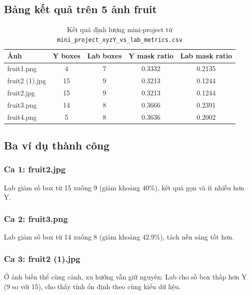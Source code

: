 \documentclass[12pt,a4paper]{article}
\begin{document}
\subsection{Bảng kết quả trên 5 ảnh fruit}
\begin{table}[H]
    \centering
    \caption{Kết quả định lượng mini-project từ \texttt{mini\_project\_xyzY\_vs\_lab\_metrics.csv}}
    \begin{tabular}{lcccc}
        \toprule
        Ảnh & Y boxes & Lab boxes & Y mask ratio & Lab mask ratio \\
        \midrule
        fruit1.png & 4 & 7 & 0.3332 & 0.2135 \\
        fruit2 (1).jpg & 15 & 9 & 0.3213 & 0.1244 \\
        fruit2.jpg & 15 & 9 & 0.3213 & 0.1244 \\
        fruit3.png & 14 & 8 & 0.3666 & 0.2391 \\
        fruit4.png & 5 & 8 & 0.3636 & 0.2002 \\
        \bottomrule
    \end{tabular}
\end{table}

\subsection{Ba ví dụ thành công}

\subsubsection{Ca 1: fruit2.jpg}
Lab giảm số box từ 15 xuống 9 (giảm khoảng 40\%), kết quả gọn và ít nhiễu hơn Y.

\subsubsection{Ca 2: fruit3.png}
Lab giảm số box từ 14 xuống 8 (giảm khoảng 42.9\%), tách nền sáng tốt hơn.

\subsubsection{Ca 3: fruit2 (1).jpg}
Ở ảnh biến thể cùng cảnh, xu hướng vẫn giữ nguyên: Lab cho số box thấp hơn Y
(9 so với 15), cho thấy tính ổn định theo cùng kiểu dữ liệu.
\end{document}
